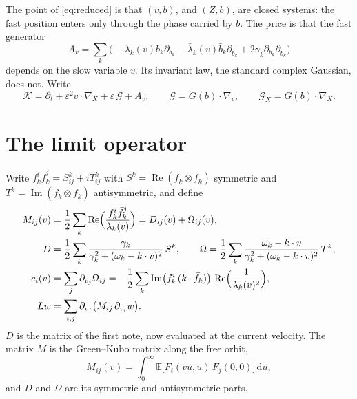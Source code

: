 \documentclass[11pt]{article}
\newcommand{\dd}{\mathrm{d}}
\newcommand{\E}{\mathbb{E}}
\newcommand{\eps}{\varepsilon}
\newcommand{\cG}{\mathcal{G}}
\newcommand{\cK}{\mathcal{K}}
\renewcommand{\Re}{\operatorname{Re}}
\renewcommand{\Im}{\operatorname{Im}}
\theoremstyle{remark}
\begin{document}
The point of \eqref{eq:reduced} is that $(v,b)$, and $(Z,b)$, are closed
systems: the fast position enters only through the phase carried by $b$.
The price is that the fast generator
\[
  A_v=\sum_k\bigl(-\lambda_k(v)b_k\partial_{b_k}
     -\bar\lambda_k(v)\bar b_k\partial_{\bar b_k}
     +2\gamma_k\partial_{b_k}\partial_{\bar b_k}\bigr)
\]
depends on the slow variable $v$. Its invariant law, the standard complex
Gaussian, does not. Write
\[
  \cK=\partial_t+\eps^2v\cdot\nabla_X+\eps\,\cG+A_v,\qquad
  \cG=G(b)\cdot\nabla_v,\qquad \cG_X=G(b)\cdot\nabla_X .
\]

\section{The limit operator}

Write $f_k^i\bar f_k^j=S^k_{ij}+iT^k_{ij}$ with $S^k=\Re(f_k\otimes\bar f_k)$
symmetric and $T^k=\Im(f_k\otimes\bar f_k)$ antisymmetric, and define
\begin{align}
  M_{ij}(v)&=\frac12\sum_k\Re\Bigl(\frac{f_k^i\bar f_k^j}{\lambda_k(v)}\Bigr)
     =D_{ij}(v)+\Omega_{ij}(v), \notag\\
  D&=\frac12\sum_k\frac{\gamma_k}{\gamma_k^2+(\omega_k-k\cdot v)^2}\,S^k,
  \qquad
  \Omega=\frac12\sum_k\frac{\omega_k-k\cdot v}{\gamma_k^2+(\omega_k-k\cdot v)^2}\,T^k,
  \label{eq:M}\\
  c_i(v)&=\sum_j\partial_{v_j}\Omega_{ij}
     =-\frac12\sum_k\Im\bigl(f_k^i\,(k\cdot\bar f_k)\bigr)\,
       \Re\Bigl(\frac1{\lambda_k(v)^2}\Bigr),
  \label{eq:c}\\
  Lw&=\sum_{i,j}\partial_{v_j}\bigl(M_{ij}\,\partial_{v_i}w\bigr).
  \label{eq:L}
\end{align}
$D$ is the matrix of the first note, now evaluated at the current velocity.
The matrix $M$ is the Green--Kubo matrix along the free orbit,
\[
  M_{ij}(v)=\int_0^\infty\E\bigl[F_i(vu,u)\,F_j(0,0)\bigr]\,\dd u ,
\]
and $D$ and $\Omega$ are its symmetric and antisymmetric parts.
\end{document}
